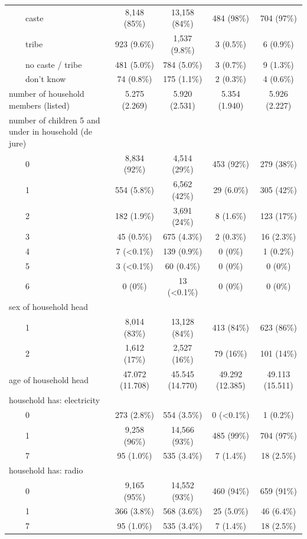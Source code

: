 \documentclass[
]{article}
\begin{document}
\begin{table}[t]
\begin{tabular*}{\linewidth}{@{\extracolsep{\fill}}lcccc}
    caste & 8,148 (85\%) & 13,158 (84\%) & 484 (98\%) & 704 (97\%) \\ 
    tribe & 923 (9.6\%) & 1,537 (9.8\%) & 3 (0.5\%) & 6 (0.9\%) \\ 
    no caste / tribe & 481 (5.0\%) & 784 (5.0\%) & 3 (0.7\%) & 9 (1.3\%) \\ 
    don't know & 74 (0.8\%) & 175 (1.1\%) & 2 (0.3\%) & 4 (0.6\%) \\ 
number of household members (listed) & 5.275
(2.269) & 5.920
(2.531) & 5.354
(1.940) & 5.926
(2.227) \\ 
number of children 5 and under in household (de jure) &  &  &  &  \\ 
    0 & 8,834 (92\%) & 4,514 (29\%) & 453 (92\%) & 279 (38\%) \\ 
    1 & 554 (5.8\%) & 6,562 (42\%) & 29 (6.0\%) & 305 (42\%) \\ 
    2 & 182 (1.9\%) & 3,691 (24\%) & 8 (1.6\%) & 123 (17\%) \\ 
    3 & 45 (0.5\%) & 675 (4.3\%) & 2 (0.3\%) & 16 (2.3\%) \\ 
    4 & 7 (<0.1\%) & 139 (0.9\%) & 0 (0\%) & 1 (0.2\%) \\ 
    5 & 3 (<0.1\%) & 60 (0.4\%) & 0 (0\%) & 0 (0\%) \\ 
    6 & 0 (0\%) & 13 (<0.1\%) & 0 (0\%) & 0 (0\%) \\ 
sex of household head &  &  &  &  \\ 
    1 & 8,014 (83\%) & 13,128 (84\%) & 413 (84\%) & 623 (86\%) \\ 
    2 & 1,612 (17\%) & 2,527 (16\%) & 79 (16\%) & 101 (14\%) \\ 
age of household head & 47.072
(11.708) & 45.545
(14.770) & 49.292
(12.385) & 49.113
(15.511) \\ 
household has: electricity &  &  &  &  \\ 
    0 & 273 (2.8\%) & 554 (3.5\%) & 0 (<0.1\%) & 1 (0.2\%) \\ 
    1 & 9,258 (96\%) & 14,566 (93\%) & 485 (99\%) & 704 (97\%) \\ 
    7 & 95 (1.0\%) & 535 (3.4\%) & 7 (1.4\%) & 18 (2.5\%) \\ 
household has: radio &  &  &  &  \\ 
    0 & 9,165 (95\%) & 14,552 (93\%) & 460 (94\%) & 659 (91\%) \\ 
    1 & 366 (3.8\%) & 568 (3.6\%) & 25 (5.0\%) & 46 (6.4\%) \\ 
    7 & 95 (1.0\%) & 535 (3.4\%) & 7 (1.4\%) & 18 (2.5\%) \\ 

\end{tabular*}
\end{table}
\end{document}
